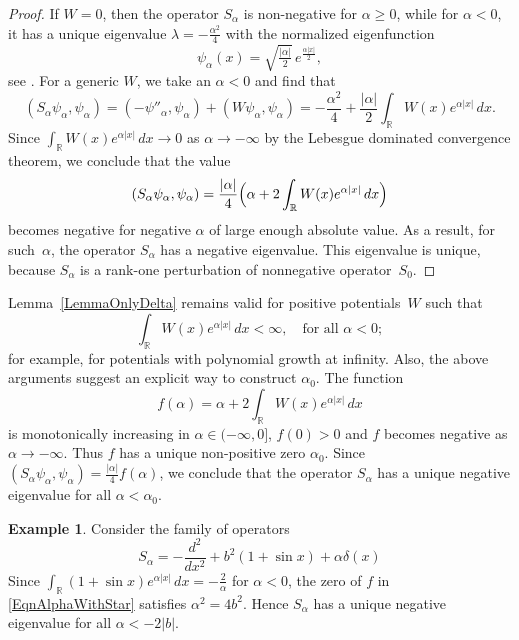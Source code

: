 \documentclass[reqno]{amsart}
\theoremstyle{definition}
\newtheorem{exm}{Example}
\theoremstyle{remark}
\numberwithin{equation}{section}
\newcommand{\Real}{\mathbb R}
\begin{document}
\begin{proof}
If $W=0$, then the operator $S_\alpha$ is non-negative for $\alpha\ge0$, while for $\alpha<0$, it has a unique eigenvalue $\lambda=-\frac{\alpha^2}4$ with the normalized eigenfunction
	\begin{equation*}
		\psi_\alpha(x)=\sqrt{\tfrac{|\alpha|}2}\,e^{\frac{\alpha|x|}2},
	\end{equation*}
see \cite[Th.3.1.4]{Albeverio2edition}. For a generic $W$, we take an $\alpha<0$ and find that
	\begin{equation*}
		(S_\alpha\psi_\alpha,\psi_\alpha)
		= (-\psi''_\alpha,\psi_\alpha)+(W\psi_\alpha,\psi_\alpha)
		= -\frac{\alpha^2}{4} + \frac{|\alpha|}{2} \int_{\Real} W(x) e^{\alpha |x|}\,dx.
	\end{equation*}
	Since $\int_\Real W(x) e^{\alpha |x|}\,dx \to 0$ as $\alpha \to -\infty$ by the Lebesgue dominated convergence theorem, we conclude that the value
	\begin{equation*}
		(S_\alpha\psi_\alpha,\psi_\alpha)=\frac{|\alpha|}{4} \Bigl(\alpha + 2\int_\Real  W(x) e^{\alpha |x|}\,dx \Bigr)
	\end{equation*}
	becomes negative for negative $\alpha$ of large enough absolute value. As a result, for such~$\alpha$, the operator $S_\alpha$ has a negative eigenvalue. This eigenvalue is unique, because $S_\alpha$ is a rank-one perturbation of nonnegative operator~$S_0$.
\end{proof}	

Lemma~\ref{LemmaOnlyDelta} remains valid for positive potentials~$W$ such that
\begin{equation*}
	\int_\Real  W(x) e^{\alpha |x|}\,dx<\infty, \quad \text{for all }\alpha<0;
\end{equation*}
for example, for potentials with polynomial growth at infinity. Also, the above arguments suggest an explicit way to construct $\alpha_0$. The function
\begin{equation}\label{EqnAlphaWithStar}
	f(\alpha) = \alpha + 2\int_\Real  W(x) e^{\alpha |x|}\,dx
\end{equation}
is monotonically increasing in $\alpha\in(-\infty,0]$, $f(0)>0$ and $f$ becomes negative as $\alpha\to-\infty$.
Thus $f$ has a unique non-positive zero $\alpha_0$. Since $(S_\alpha\psi_\alpha,\psi_\alpha) = \frac{|\alpha|}{4}f(\alpha)$, we conclude that the operator $S_\alpha$ has a unique negative eigenvalue for all $\alpha<\alpha_0$.
	
\begin{exm}\rm	
Consider the family of operators
\begin{equation*}
    S_\alpha =  -\frac{d^2}{dx^2} +b^2(1+\sin x) + \alpha\delta(x)
\end{equation*}
Since $\int_\Real  (1+\sin x) e^{\alpha |x|}\,dx=-\frac{2}{\alpha}$ for $\alpha<0$, the zero of $f$ in \eqref{EqnAlphaWithStar} satisfies $\alpha^2=4b^2$. Hence $S_\alpha$ has a unique negative eigenvalue for all $\alpha<-2|b|$.
\end{exm}
\end{document}
